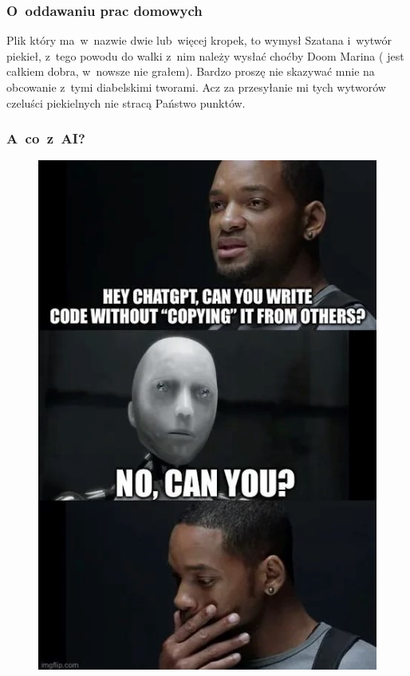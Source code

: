 \documentclass[10pt,t]{beamer}
\begin{document}
\begin{frame}
  \frametitle{O~oddawaniu prac domowych}


  Plik który ma~w~nazwie dwie lub~więcej kropek, to wymysł Szatana i~wytwór
  piekieł, z~tego powodu do walki z~nim należy wysłać choćby Doom Marina
  ( jest całkiem dobra, w~nowsze nie grałem).
  Bardzo proszę nie skazywać mnie na obcowanie z~tymi diabelskimi tworami.
  Acz za przesyłanie mi tych wytworów czeluści piekielnych nie stracą
  Państwo punktów.

\end{frame}





\begin{frame}
  \frametitle{A~co~z~AI?}

  \vspace{-0.5em}


  \begin{figure}

    \label{fig:Coping-for-others}

    \centering


    \includegraphics[scale=0.415]
    {./Presentations-pictures/Copying-from-others.jpg}

  \end{figure}

\end{frame}
\end{document}
